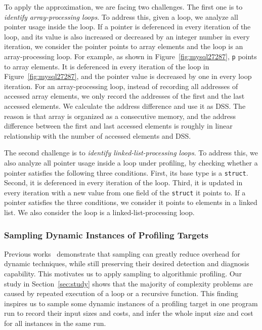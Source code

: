 {{To apply the approximation, we are facing two challenges. 
The first one is to \emph{identify array-processing loops}.
To address this, given a loop, we analyze all pointer usage inside the loop. 
If a pointer is deferenced in every iteration of the loop, 
and its value is also increased or decreased by 
an integer number in every iteration,
we consider the pointer points to array elements and 
the loop is an array-processing loop.  
For example, as shown in Figure~\ref{fig:mysql27287}, 
\texttt{p} points to array elements. 
It is deferenced in every iteration of the loop 
in Figure~\ref{fig:mysql27287},
and the pointer value is decreased by one in every loop iteration. 
For an array-processing loop, 
instead of recording all addresses of 
accessed array elements,
we only record the addresses 
of the first and the last accessed elements. 
We calculate the address difference and use it as DSS.
The reason is that array is organized as a 
consecutive memory, and the address difference 
between the first and last accessed elements is roughly in linear 
relationship with the number of accessed elements and DSS. 




The second challenge is to \emph{identify linked-list-processing loops}.
To address this, we also analyze all pointer usage inside a loop under profiling, 
by checking whether a pointer satisfies the following three conditions.
First, its base type is a \texttt{struct}.
Second, it is deferenced in every iteration of the loop.
Third, it is updated in every iteration with a new value 
from one field of the \texttt{struct} it points to.
If a pointer satisfies the three conditions, 
we consider it points to elements in a linked list.
We also consider the loop is a linked-list-processing loop. 



\subsubsection{Sampling Dynamic Instances of Profiling Targets}
\label{sec:sampling}

Previous works~\cite{liblit03,liblit05,CCI,SongOOPSLA2014,ldoctor}
demonstrate that sampling can greatly 
reduce overhead for dynamic techniques,
while still preserving their desired 
detection and diagnosis capability. 
This motivates us to apply sampling to algorithmic profiling. 
Our study in Section~\ref{sec:study} shows that 
the majority of complexity problems are caused by repeated execution of a loop
or a recursive function. 
This finding inspires us to sample some dynamic instances of 
a profiling target in one program run to 
record their input sizes and costs,
and infer the whole input size and cost for all instances in the same run.


}}
